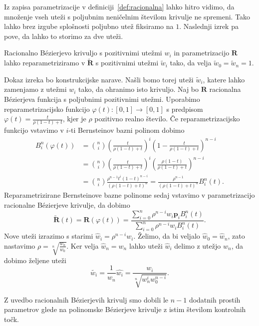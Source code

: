 \documentclass[isrm2, tisk]{fmfdelo}
\newcommand{\p}{\mathbf{p}}
\begin{document}
    Iz zapisa parametrizacije v definiciji~\ref{def:racionalna} lahko hitro vidimo, da množenje vseh uteži s poljubnim neničelnim številom krivulje ne spremeni.
    Tako lahko brez izgube splošnosti poljubno utež fiksiramo na $1$.
    Naslednji izrek pa pove, da lahko to storimo za dve uteži.
    \begin{izrek}
        \label{izrek:racionalne-utezi-1}
        Racionalno Bézierjevo krivuljo s pozitivnimi utežmi $w_i$ in parametrizacijo $\mathbf{R}$ lahko reparametriziramo v $\mathbf{\tilde{R}}$ s pozitivnimi utežmi $\tilde{w}_i$ tako, da velja $\tilde{w}_0=\tilde{w}_{n}=1.$
    \end{izrek}
    \begin{dokaz}
        Dokaz izreka bo konstrukcijske narave.
        Našli bomo torej uteži $\tilde{w}_i$, katere lahko zamenjamo z utežmi $w_i$ tako, da ohranimo isto krivuljo.
        Naj bo $\mathbf{R}$ racionalna Bézierjeva funkcija s poljubnimi pozitivnimi utežmi.
        Uporabimo reparametrizacijsko funkcijo $\varphi(t):[0,1]\to[0,1]$ s predpisom $\varphi(t)=\frac{t}{\rho(1-t)+t}$, kjer je $\rho$ pozitivno realno število.
        Če reparametrizacijsko funkcijo vstavimo v $i$-ti Bernsteinov bazni polinom dobimo
        \begin{align*}
            B^n_i(\varphi(t)) &=  \binom{n}{i}\left(\frac{t}{\rho (1-t)+t}\right)^i\left(1-\frac{t}{\rho (1-t)+t}\right)^{n-i} \\
            &=  \binom{n}{i}\left(\frac{t}{\rho (1-t)+t}\right)^i\left(\frac{\rho(1-t)}{\rho (1-t)+t}\right)^{n-i} \\
            &= \binom{n}{i}\frac{\rho^{n-1}t^{i}(1-t)^{n-i}}{(\rho(1-t)+t)^n} =  \frac{\rho^{n-1}}{(\rho(1-t)+t)^n}B^n_i(t).
        \end{align*}
        Reparametrizirane Bernsteinove bazne polinome sedaj vstavimo v parametrizacijo racionalne Bézierjeve krivulje, da dobimo
        \[\mathbf{\tilde{R}}(t)=\mathbf{R}(\varphi(t)) = \frac{\sum^{n}_{i=0}\rho^{n-i}w_i\p_i B^n_i(t)}{\sum^{n}_{i=0}\rho^{n-i}w_i B^n_i(t)}. \]
        Nove uteži izrazimo s starimi $\hat{w}_i=\rho^{n-i}w_i$.
        Želimo, da bi veljalo $\hat{w}_0=\hat{w}_n$, zato nastavimo $\rho= \sqrt[n]{\frac{w_n}{w_0}}$.
        Ker velja $\hat{w}_n=w_n$ lahko uteži $\hat{w}_i$ delimo z utežjo $w_n$, da dobimo željene uteži \[\tilde{w_i}=\frac{1}{w_n}\hat{w_i} = \frac{w_i}{\sqrt[n]{w^{i}_nw_0^{n-i}}}.\]
    \end{dokaz}
    \begin{posledica}
        Z uvedbo racionalnih Bézierjevih krivulj smo dobili le $n-1$ dodatnih prostih parametrov glede na polinomske Bézierjeve krivulje z istim številom kontrolnih točk.
    \end{posledica}
\end{document}
